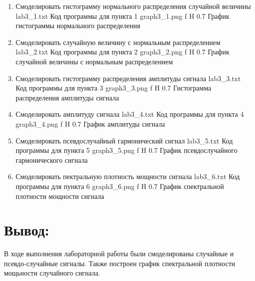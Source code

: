 \documentclass{bmstu}
\begin{document}
\begin{enumerate}

\item Смоделировать гистограмму нормального распределения случайной величины
	{lab3_1.txt}
	{Код программы для пункта 1}
	{graph3_1.png}
	{f}
	{H}
	{0.7\textwidth}
	{График гистограммы нормального распределения}

\item Смоделировать случайную величину с нормальным распределением
	{lab3_2.txt}
	{Код программы для пункта 2}
	{graph3_2.png}
	{f}
	{H}
	{0.7\textwidth}
	{График случайной величины с нормальным распределением}
	

\item Смоделировать гистограмму распределения амплитуды сигнала
	{lab3_3.txt}
	{Код программы для пункта 3}
	{graph3_3.png}
	{f}
	{H}
	{0.7\textwidth}
	{Гистограмма распределения амплитуды сигнала}
	
	
\item Смоделировать амплитуду сигнала
	{lab3_4.txt}
	{Код программы для пункта 4}
	{graph3_4.png}
	{f}
	{H}
	{0.7\textwidth}
	{График амплитуды сигнала}
	
	
\item Смоделировать псевдослучайный гармонический сигнал
	{lab3_5.txt}
	{Код программы для пункта 5}
	{graph3_5.png}
	{f}
	{H}
	{0.7\textwidth}
	{График псевдослучайного гармонического сигнала}
	
	
\item Смоделировать пектральную плотность мощности сигнала
	{lab3_6.txt}
	{Код программы для пункта 6}
	{graph3_6.png}
	{f}
	{H}
	{0.7\textwidth}
	{График спектральной плотности мощности сигнала}	

\end{enumerate}

\chapter{Вывод:} 
В ходе выполнения лабораторной работы были смоделированы случайные и псевдо-случайные сигналы. 
Также построен график спектральной плотности мощьности случайного сигнала.
\end{document}
